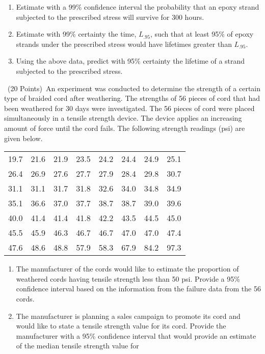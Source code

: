 \documentclass{article}\usepackage{graphicx, color}
\def\be{\begin{enumerate}}
\def\ee{\end{enumerate}}
\def\vvn{\vskip0mm\noindent}
\begin{document}
\begin{enumerate}
\item[(A)] Estimate with a 99\% confidence interval the probability that an epoxy strand
subjected to the prescribed stress will survive for 300 hours.
\item[(B)] Estimate with 99\% certainty the time, $L_{.95}$, such that at least 95\% of epoxy
strands under the prescribed  stress would have lifetimes greater than $L_{.95}$.
\item[(C)] Using the above data, predict with 95\% certainty the lifetime of  a strand subjected to the prescribed stress.
\ee
\vvn
\item[V.] \ (20 Points)\ An experiment was
conducted to determine the strength of a certain type of braided
cord after weathering. The strengths of 56 pieces of cord that had
been weathered for 30 days were investigated. The 56 pieces of
cord were placed simultaneously in a tensile strength device. The
device applies an increasing amount of force until the cord fails.
The following strength readings (psi) are given below.
\vvn\vvn
\begin{center}
\begin{tabular}{|cccccccc|}\hline
 19.7& 21.6& 21.9& 23.5& 24.2& 24.4& 24.9& 25.1\\
 26.4& 26.9& 27.6& 27.7& 27.9& 28.4& 29.8& 30.7\\
 31.1& 31.1& 31.7& 31.8& 32.6& 34.0& 34.8& 34.9\\
 35.1& 36.6& 37.0& 37.7& 38.7& 38.7& 39.0& 39.6\\
 40.0& 41.4& 41.4& 41.8& 42.2& 43.5& 44.5& 45.0\\
 45.5& 45.9& 46.3& 46.7& 46.7& 47.0& 47.0& 47.4\\
 47.6& 48.6& 48.8& 57.9& 58.3& 67.9& 84.2& 97.3\\
  \hline
\end{tabular}
\end{center}
\vvn
\be
\item[(A)] The manufacturer of the cords would
like to estimate  the
  proportion of weathered cords having tensile strength less than 50
  psi. Provide a 95\% confidence interval based on the information
  from the failure data from the 56 cords.
\item[(B)] The manufacturer is planning a sales campaign to
promote
  its cord and would like to state a tensile strength value for its
  cord. Provide the manufacturer with a 95\% confidence interval that
  would provide an estimate of the median tensile strength value for

\end{enumerate}
\end{document}
